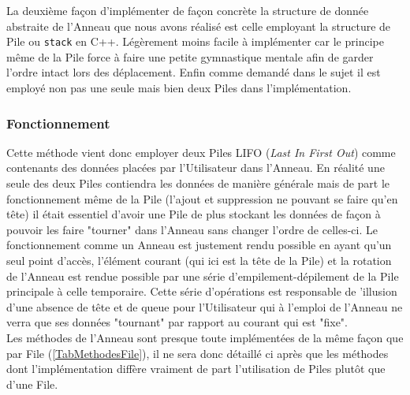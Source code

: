 \documentclass{article}
\newcommand{\info}{\texttt}
\begin{document}
    La deuxième façon d'implémenter de façon concrète la structure de donnée abstraite de l'Anneau que nous avons réalisé est celle employant la structure de Pile ou \info{stack} en C++. Légèrement moins facile à implémenter car le principe même de la Pile force à faire une petite gymnastique mentale afin de garder l'ordre intact lors des déplacement. Enfin comme demandé dans le sujet il est employé non pas une seule mais bien deux Piles dans l'implémentation.
    
        \subsubsection{Fonctionnement}
        
        Cette méthode vient donc employer deux Piles LIFO (\emph{Last In First Out}) comme contenants des données placées par l'Utilisateur dans l'Anneau. En réalité une seule des deux Piles contiendra les données de manière générale mais de part le fonctionnement même de la Pile (l'ajout et suppression ne pouvant se faire qu'en tête) il était essentiel d'avoir une Pile de plus stockant les données de façon à pouvoir les faire "tourner" dans l'Anneau sans changer l'ordre de celles-ci. Le fonctionnement comme un Anneau est justement rendu possible en ayant qu'un seul point d'accès, l'élément courant (qui ici est la tête de la Pile) et la rotation de l'Anneau est rendue possible par une série d'empilement-dépilement de la Pile principale à celle temporaire. Cette série d'opérations est responsable de 'illusion d'une absence de tête et de queue pour l'Utilisateur qui à l'emploi de l'Anneau ne verra que ses données "tournant" par rapport au courant qui est "fixe".\\
        Les méthodes de l'Anneau sont presque toute implémentées de la même façon que par File (\ref{TabMethodesFile}), il ne sera donc détaillé ci après que les méthodes dont l'implémentation diffère vraiment de part l'utilisation de Piles plutôt que d'une File.
\end{document}
